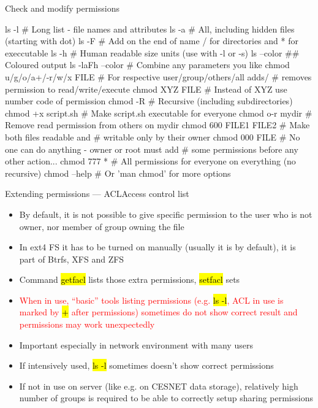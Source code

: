 \documentclass[compress, ucs, xelatex, 11pt, xcolor=svgnames,
  hyperref={
    bookmarks=true,
    unicode=true,
    colorlinks=true,
    pdftitle={Linux, command line and MetaCentrum},
    plainpages=false,
    pdfauthor={Vojtech Zeisek},
    pdfsubject={Course about use of Linux command line, writing shell scripts and using MetaCentrum of CESNET},
    pdfcreator={XeLaTeX},
    pdfkeywords={Linux, GNU, BASH, shell, command line, MetaCentrum},
    linkcolor=DarkRed,
    anchorcolor=DarkBlue,
    citecolor=Indigo,
    filecolor=NavyBlue,
    menucolor=DarkMagenta,
    urlcolor=DarkBlue,
    pdftex},
  url={hyphens, lowtilde} %
  ]{beamer}
\renewcommand{\texttt}[1]{\hl{\ttfamily #1}}
\renewcommand{\alert}[1]{\textcolor{red}{#1}}
\begin{document}
\begin{frame}[fragile]{Check and modify permissions}
  \begin{bashcode}
    ls -l # Long list - file names and attributes
    ls -a # All, including hidden files (starting with dot)
    ls -F # Add on the end of name / for directories and * for execcutable
    ls -h # Human readable size units (use with -l or -s)
    ls --color ## Coloured output
    ls -laFh --color # Combine any parameters you like
    chmod u/g/o/a+/-r/w/x FILE # For respective user/group/others/all adds/
                               # removes permission to read/write/execute
    chmod XYZ FILE # Instead of XYZ use number code of permission
    chmod -R # Recursive (including subdirectories)
    chmod +x script.sh # Make script.sh executable for everyone
    chmod o-r mydir # Remove read permission from others on mydir
    chmod 600 FILE1 FILE2 # Make both files readable and
                          # writable only by their owner
    chmod 000 FILE # No one can do anything - owner or root must add
                   # some permissions before any other action...
    chmod 777 * # All permissions for everyone on everything (no recursive)
    chmod --help # Or 'man chmod' for more options 
  \end{bashcode}
\end{frame}

\begin{frame}{Extending permissions --- ACL}{Access control list}
  \label{acl}
  \begin{itemize}
    \item By default, it is not possible to give specific permission to the user who is not owner, nor member of group owning the file
    \item In ext4 FS it has to be turned on manually (usually it is by default), it is part of Btrfs, XFS and ZFS
    \item Command \texttt{getfacl} lists those extra permissions, \texttt{setfacl} sets
    \item \alert{When in use, ``basic'' tools listing permissions (e.g. \texttt{ls -l}, ACL in use is marked by \texttt{+} after permissions) sometimes do not show correct result and permissions may work unexpectedly}
    \item Important especially in network environment with many users
    \item If intensively used, \texttt{ls -l} sometimes doesn't show correct permissions
    \item If not in use on server (like e.g. on CESNET data storage), relatively high number of groups is required to be able to correctly setup sharing permissions
  \end{itemize}
\end{frame}
\end{document}
